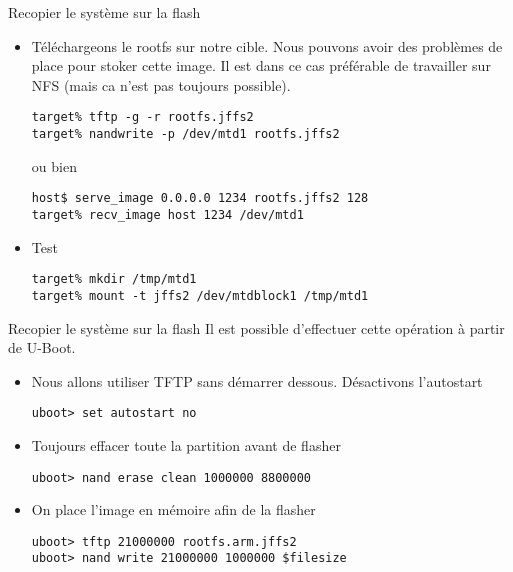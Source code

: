 \begin{frame}[fragile=singleslide]{Recopier le système sur la flash}
  \begin{itemize}
  \item Téléchargeons  le rootfs sur  notre cible. Nous  pouvons avoir
    des problèmes  de place pour stoker  cette image.  Il  est dans ce
    cas préférable de  travailler sur NFS (mais ca  n'est pas toujours
    possible).
    \begin{lstlisting}
target% tftp -g -r rootfs.jffs2
target% nandwrite -p /dev/mtd1 rootfs.jffs2
    \end{lstlisting}
    ou bien
    \begin{lstlisting}
host$ serve_image 0.0.0.0 1234 rootfs.jffs2 128
target% recv_image host 1234 /dev/mtd1
    \end{lstlisting}
  \item  Test
    \begin{lstlisting}
target% mkdir /tmp/mtd1
target% mount -t jffs2 /dev/mtdblock1 /tmp/mtd1
    \end{lstlisting}
  \end{itemize}
\end{frame}

\begin{frame}[fragile=singleslide]{Recopier le système sur la flash}
  Il est possible d'effectuer cette opération à partir de U-Boot.
  \begin{itemize}
  \item Nous allons utiliser TFTP sans démarrer dessous. Désactivons l'autostart
    \begin{lstlisting}
uboot> set autostart no
    \end{lstlisting}
  \item Toujours effacer toute la partition avant de flasher
    \begin{lstlisting}
uboot> nand erase clean 1000000 8800000
    \end{lstlisting}
  \item On place l'image en mémoire afin de la flasher
    \begin{lstlisting}
uboot> tftp 21000000 rootfs.arm.jffs2
uboot> nand write 21000000 1000000 $filesize
    \end{lstlisting}
  \end{itemize}
\end{frame}

